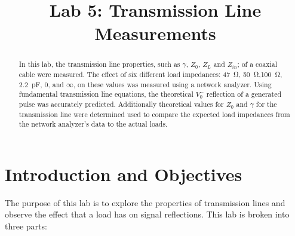 \documentclass[conference]{IEEEtran}
\begin{document}
\title{Lab 5: Transmission Line Measurements}
\author{
}
\maketitle
\IEEEpeerreviewmaketitle

\begin{abstract}
In this lab, the transmission line properties, such as $\gamma$, $Z_0$, $Z_L$
and $Z_{in}$; of a coaxial cable were measured. The effect of six different
load impedances: \SI{47}{\ohm}, \SI{50}{\ohm},\SI{100}{\ohm},
\SI{2.2}{\pico\farad}, $0$, and $\infty$, on these values was measured using a
network analyzer. Using fundamental transmission line equations, the
theoretical $V_0^-$ reflection of a generated pulse was accurately predicted.
Additionally theoretical values for $Z_0$ and $\gamma$ for the transmission line
were determined used to compare the expected load impedances from the network
analyzer's data to the actual loads.

\end{abstract}

\section{Introduction and Objectives}
The purpose of this lab is to explore the properties of transmission lines and
observe the effect that a load has on signal reflections. This lab is broken
into three parts:
\end{document}

